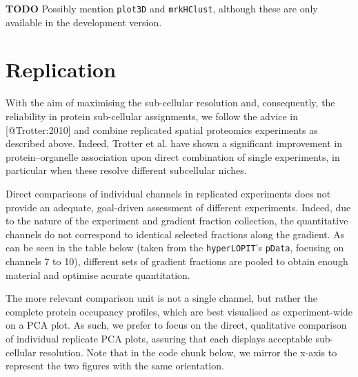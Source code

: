 \textbf{TODO} Possibly mention \texttt{plot3D} and \texttt{mrkHClust},
although these are only available in the development version.

\section{Replication}\label{replication}

With the aim of maximising the sub-cellular resolution and,
consequently, the reliability in protein sub-cellular assignments, we
follow the advice in {[}@Trotter:2010{]} and combine replicated spatial
proteomics experiments as described above. Indeed, Trotter et al. have
shown a significant improvement in protein--organelle association upon
direct combination of single experiments, in particular when these
resolve different subcellular niches.

Direct comparisons of individual channels in replicated experiments does
not provide an adequate, goal-driven assessment of different
experiments. Indeed, due to the nature of the experiment and gradient
fraction collection, the quantitative channels do not correspond to
identical selected fractions along the gradient. As can be seen in the
table below (taken from the \texttt{hyperLOPIT}'s \texttt{pData},
focusing on channels 7 to 10), different sets of gradient fractions are
pooled to obtain enough material and optimise acurate quantitation.

The more relevant comparison unit is not a single channel, but rather
the complete protein occupancy profiles, which are best visualised as
experiment-wide on a PCA plot. As such, we prefer to focus on the
direct, qualitative comparison of individual replicate PCA plots,
assuring that each displays acceptable sub-cellular resolution. Note
that in the code chunk below, we mirror the x-axis to represent the two
figures with the same orientation.

\begin{Shaded}
\begin{Highlighting}[]
\NormalTok{(} \NormalTok{(}\NormalTok{, }\NormalTok{)) }
\NormalTok{(hl[, hl$Replicate ==}\StringTok{ }\NormalTok{], } \NormalTok{) }
\NormalTok{(hl[, hl$Replicate ==}\StringTok{ }\NormalTok{], } \NormalTok{, } \NormalTok{) }
\end{Highlighting}
\end{Shaded}

